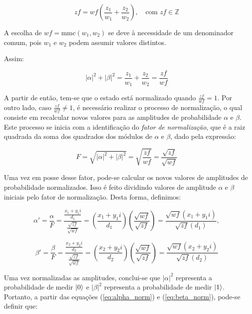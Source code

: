 \documentclass[12pt, a4paper]{article}
\begin{document}
\begin{equation}
zf=wf\left(\frac{z_1}{w_1}+\frac{z_2}{w_2}\right), \quad \text{com } zf \in \mathbb{Z}
\label{eq:zf}
\end{equation}

A escolha de \(wf=\text{mmc}(w_1, w_2)\) se deve à necessidade de um denominador comum, pois \(w_1\) e \(w_2\) podem assumir valores distintos.

Assim:

\begin{equation}
|\alpha|^2 + |\beta|^2 = \frac{z_1}{w_1} + \frac{z_2}{w_2} = \frac{zf}{wf}
\label{eq:zf_wf}
\end{equation}

A partir de então, tem-se que o estado está normalizado quando \(\frac{zf}{wf}=1\). Por outro lado, caso \(\frac{zf}{wf}\ne1\), é necessário realizar o processo de normalização, o qual consiste em recalcular novos valores para as amplitudes de probabilidade \(\alpha\) e \(\beta\). Este processo se inicia com a identificação do \textit{fator de normalização}, que é a raiz quadrada da soma dos quadrados dos módulos de \(\alpha\) e \(\beta\), dado pela expressão:

\begin{equation}
F=\sqrt{|\alpha|^2+|\beta|^2}=\sqrt{\frac{zf}{wf}}=\frac{\sqrt{zf}}{\sqrt{wf}}
\label{eq:norm_factor}
\end{equation}

Uma vez em posse desse fator, pode-se calcular os novos valores de amplitudes de probabilidade normalizados. Isso é feito dividindo valores de amplitude \(\alpha\) e \(\beta\) iniciais pelo fator de normalização. Desta forma, definimos:

\begin{equation}
\alpha'=\frac{\alpha}{F}=\frac{\frac{x_1+y_1i}{d_1}}{\frac{\sqrt{zf}}{\sqrt{wf}}}=\left(\frac{x_1+y_1i}{d_1}\right)\left(\frac{\sqrt{wf}}{\sqrt{zf}}\right)=\frac{\sqrt{wf}\left(x_1+y_1i\right)}{\sqrt{zf}\left(d_1\right)},
\label{eq:alpha_norm}
\end{equation}

\begin{equation}
\beta'=\frac{\beta}{F}=\frac{\frac{x_2+y_2i}{d_2}}{\frac{\sqrt{zf}}{\sqrt{wf}}}=\left(\frac{x_2+y_2i}{d_2}\right)\left(\frac{\sqrt{wf}}{\sqrt{zf}}\right)=\frac{\sqrt{wf}\left(x_2+y_2i\right)}{\sqrt{zf}\left(d_2\right)}
\label{eq:beta_norm}
\end{equation}

Uma vez normalizadas as amplitudes, conclui-se que \(|\alpha|^2\) representa a probabilidade de medir \(\ket{0}\) e \(|\beta|^2\) representa a probabilidade de medir \(\ket{1}\). Portanto, a partir das equações (\ref{eq:alpha_norm}) e (\ref{eq:beta_norm}), pode-se definir que:
\end{document}
